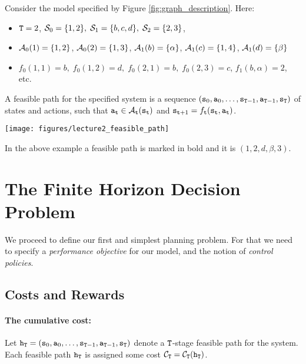 \begin{example}
Consider the model specified by Figure \ref{fig:graph_description}. Here:
\begin{itemize}
  \item ${\tt T} = 2$, ${\mathcal{S}_0} = \{ 1,2\} ,\;{\mathcal{S}_1} = \{ b,c,d\} ,\;{\mathcal{S}_2} = \{ 2,3\} $,
  \item ${\mathcal{A}_0}(1) = \{ 1,2\} $, ${\mathcal{A}_0}(2) = \{ 1,3\} $, ${\mathcal{A}_1}(b) = \{ \alpha \} $, ${\mathcal{A}_1}(c) = \{ 1,4\} $, ${\mathcal{A}_1}(d) = \{ \beta \} $
  \item ${f_0}(1,1) = b,\;{f_0}(1,2) = d,\;{f_0}(2,1) = b,\;{f_0}(2,3) = c$, ${f_1}(b,\alpha ) = 2$, etc.
\end{itemize}
\end{example}

\begin{definition}
A feasible path for the specified system is a sequence
$({{\tt s}_0},{{\tt a}_0}, \ldots ,{{\tt s}_{{\tt T} -
1}},{{\tt a}_{{\tt T} - 1}},{{\tt s}_{\tt T}})$ of states and
actions, such that ${{\tt a}_{{\tt t}}} \in
{\mathcal{A}_{{\tt t}}}({{\tt s}_{{\tt t}}})$ and ${{\tt s}_{{\tt t} + 1}} =
{f_{{\tt t}}}({{\tt s}_{{\tt t}}},{{\tt a}_{{\tt t}}})$.

\bigskip

\begin{centering}
\texttt{[image: figures/lecture2\_feasible\_path]}\\
\end{centering}
\end{definition}

In the above example a feasible path is marked in bold and it is $(1,2,d,\beta,3)$.

\section{The Finite Horizon Decision Problem}

We proceed to define our first and simplest planning problem. For
that we need to specify a \emph{performance objective} for our
model, and the notion of \emph{control policies}.

\subsection{Costs and Rewards}

\paragraph{The cumulative cost:}
Let ${{\tt h}_{\tt T}} = ({{\tt s}_0},{{\tt a}_0}, \ldots
,{{\tt s}_{{\tt T} -
1}},{{\tt a}_{{\tt T} - 1}},{{\tt s}_{\tt T}})$ denote a ${\tt T}$-stage feasible path
for the system. Each feasible path ${{\tt h}_{\tt T}}$ is assigned
some cost ${\mathcal{C}_{\tt T}} =
{\mathcal{C}_{\tt T}}({{\tt h}_{\tt T}})$.

